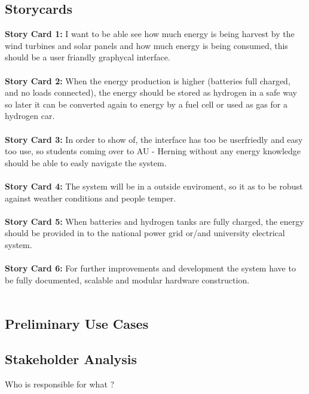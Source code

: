\subsection{Storycards}
\textbf{Story Card 1:} I want to be able see how much energy is being harvest by
the wind turbines and solar panels and how much energy is being consumed, this should be
a user friandly graphycal interface.\\\\
\textbf{Story Card 2:} When the energy production is higher (batteries full
charged, and no loads connected), the energy should be stored as hydrogen in a safe way so
later it can be converted again to energy by a fuel cell or used as gas for a
hydrogen car.\\\\
\textbf{Story Card 3:} In order to show of, the interface has too be userfriedly
and easy too use, so students coming over to AU - Herning without any energy
knowledge should be able to easly navigate the system.\\\\
\textbf{Story Card 4:} The system will be in a outside enviroment, so it as to
be robust against weather conditions and people temper.\\\\
\textbf{Story Card 5:} When batteries and hydrogen tanks are fully charged, the
energy should be provided in to the national power grid or/and university electrical
system.\\\\
\textbf{Story Card 6:} For further improvements and development the system have
to be fully documented, scalable and modular hardware construction.\\\\

\subsection{Preliminary Use Cases}

\subsection{Stakeholder Analysis}
Who is responsible for what ?\\

